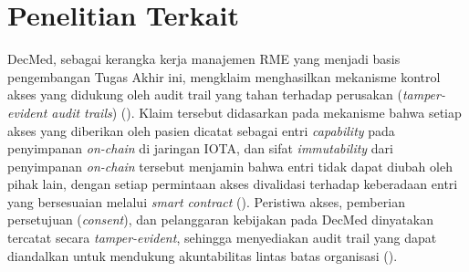 %

\section{Penelitian Terkait}
\label{sec:penelitian-terkait}

DecMed, sebagai kerangka kerja manajemen RME yang menjadi basis pengembangan Tugas Akhir ini, mengklaim menghasilkan mekanisme kontrol akses yang didukung oleh audit trail yang tahan terhadap perusakan (\textit{tamper-evident audit trails}) (\cite{DecMed}). Klaim tersebut didasarkan pada mekanisme bahwa setiap akses yang diberikan oleh pasien dicatat sebagai entri \textit{capability} pada penyimpanan \textit{on-chain} di jaringan IOTA, dan sifat \textit{immutability} dari penyimpanan \textit{on-chain} tersebut menjamin bahwa entri tidak dapat diubah oleh pihak lain, dengan setiap permintaan akses divalidasi terhadap keberadaan entri yang bersesuaian melalui \textit{smart contract} (\cite{DecMed}). Peristiwa akses, pemberian persetujuan (\textit{consent}), dan pelanggaran kebijakan pada DecMed dinyatakan tercatat secara \textit{tamper-evident}, sehingga menyediakan audit trail yang dapat diandalkan untuk mendukung akuntabilitas lintas batas organisasi (\cite{DecMed}).

